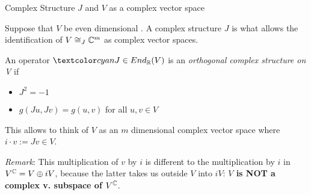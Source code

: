 \begin{frame}{Complex Structure $J$ and $V$ as a complex vector space} %
    
    Suppose that $V$ be even dimensional%
    . A complex structure $J$ is what allows the identification of $V \cong_J \mathbb C^m$ as complex vector spaces.
    
    \begin{definition}
    An operator $\defn{J} \in End_\RR(V)$ is an \emph{orthogonal complex structure on V} if 
        
        \begin{itemize}
            
        \item $J^2 = -1$
        
        \item $g(Ju, Jv) = g(u, v)$ for all $u, v \in V$
            
        \end{itemize}
    \end{definition}
    
    This allows to think of $V$ as an $m$ dimensional complex vector space where $i \cdot v := Jv \in V$.
    
    \emph{Remark}: This multiplication of $v$ by $i$ is different to the multiplication by $i$ in $V^\mathbb C = V \oplus iV$, because the latter takes us outside $V$ into $iV$: \textbf{$V$ is NOT a complex v. subspace of $V^\mathbb C$}.

\end{frame}

